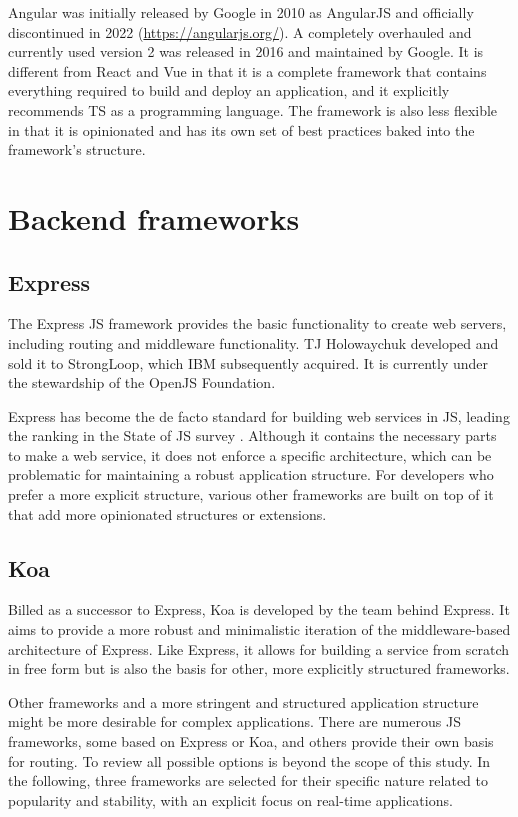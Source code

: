Angular was initially released by Google in 2010 as AngularJS and officially discontinued in 2022 (\url{https://angularjs.org/}). A completely overhauled and currently used version 2 was released in 2016 and maintained by Google. It is different from React and Vue in that it is a complete framework that contains everything required to build and deploy an application, and it explicitly recommends \ac{TS} as a programming language. The framework is also less flexible in that it is opinionated and has its own set of best practices baked into the framework's structure.




\section{Backend frameworks}

\subsection{Express}

The Express JS framework provides the basic functionality to create web servers, including routing and middleware functionality. TJ Holowaychuk developed and sold it to StrongLoop, which IBM subsequently acquired. It is currently under the stewardship of the OpenJS Foundation.

Express has become the de facto standard for building web services in JS, leading the ranking in the State of JS survey \parencite{mostUsedBackendFrameworks22}. Although it contains the necessary parts to make a web service, it does not enforce a specific architecture, which can be problematic for maintaining a robust application structure. For developers who prefer a more explicit structure, various other frameworks are built on top of it that add more opinionated structures or extensions.

\subsection{Koa}

Billed as a successor to Express, Koa is developed by the team behind Express. It aims to provide a more robust and minimalistic iteration of the middleware-based architecture of Express. Like Express, it allows for building a service from scratch in free form but is also the basis for other, more explicitly structured frameworks.

Other frameworks and a more stringent and structured application structure might be more desirable for complex applications. There are numerous \ac{JS} frameworks, some based on Express or Koa, and others provide their own basis for routing. To review all possible options is beyond the scope of this study. In the following, three frameworks are selected for their specific nature related to popularity and stability, with an explicit focus on real-time applications.

